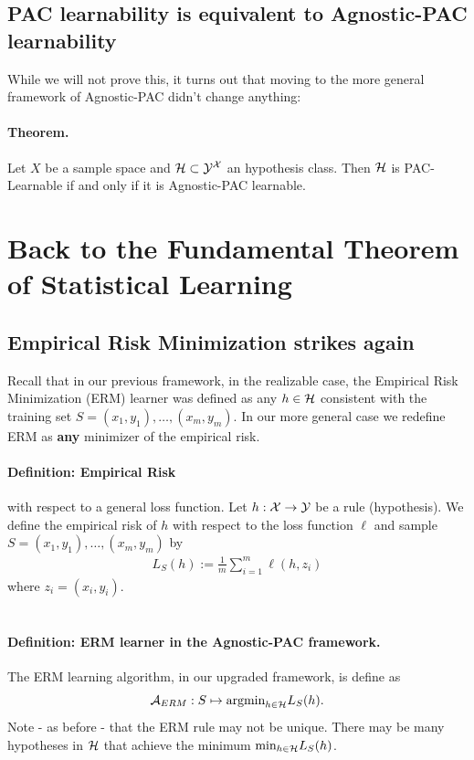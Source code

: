 \subsection{PAC learnability is equivalent to Agnostic-PAC learnability}

While we will not prove this, it turns out that moving to the more general
framework of Agnostic-PAC didn't change anything:
\paragraph{Theorem.} Let $X$ be a sample space and $\mathcal{H}\subset \mathcal{Y}^{\mathcal{X}}$ an
hypothesis class. Then $\mathcal{H}$ is PAC-Learnable if and only if it is Agnostic-PAC
learnable. 


\section{Back to the Fundamental Theorem of Statistical Learning}


\subsection{Empirical Risk Minimization strikes again}

Recall that in our previous framework, in the realizable case, the Empirical Risk Minimization (ERM) learner was
defined as any $h\in\mathcal{H}$ consistent with the training set 
$S=(x_1,y_1),\ldots,(x_m,y_m)$. In our more general case we redefine ERM as 
{\bf any} minimizer of the empirical risk.

\paragraph{Definition: Empirical Risk} with respect to a general loss function.
Let $h:\mathcal{X}\to\mathcal{Y}$ be a rule (hypothesis). We define the empirical risk of $h$ with
respect to the loss function $\ell$ and sample $S=(x_1,y_1),\ldots,(x_m,y_m)$ by 
\begin{eqnarray}
    L_S(h) := \frac{1}{m}\sum_{i=1}^m \ell(h,z_i)
\end{eqnarray}
where $z_i=(x_i,y_i)$.
\\~\\
\paragraph{Definition: ERM learner in the Agnostic-PAC framework.} The ERM learning algorithm, in our upgraded
framework, is define as
\[
\mathcal{A}_{ERM} : S \mapsto \text{argmin}_{h\in\mathcal{H}} L_S(h).
\]
Note - as before - that the ERM rule may not be unique. There may be many
hypotheses in $\mathcal{H}$ that achieve the minimum $ \text{min}_{h\in\mathcal{H}} L_S(h)$.

